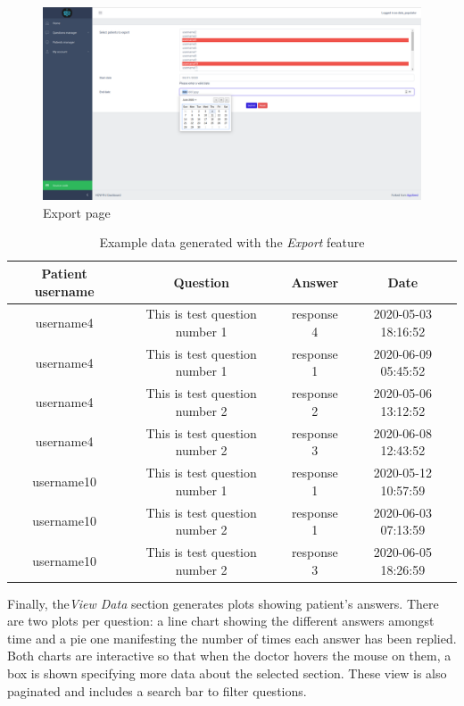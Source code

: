 \documentclass[12pt,english]{article}
\begin{document}
\begin{figure}[H]
  \centering
    \includegraphics[width=\textwidth]{export.png}
  \caption{Export page}
\end{figure}

\begin{table}[h!]
\begin{tabular}{|c|c|c|c|}
\hline
\textbf{Patient username} & \textbf{Question}& \textbf{Answer}& \textbf{Date} \\
\hline
username4 & This is test question number 1  & response 4 & 2020-05-03 18:16:52 \\

username4 & This is test question number 1  & response 1 & 2020-06-09 05:45:52 \\

username4 & This is test question number 2  & response 2 & 2020-05-06 13:12:52 \\

username4 & This is test question number 2  & response 3 & 2020-06-08 12:43:52 \\

username10 & This is test question number 1  & response 1 & 2020-05-12 10:57:59 \\

username10 & This is test question number 2  & response 1 & 2020-06-03 07:13:59 \\

username10 & This is test question number 2  & response 3 & 2020-06-05 18:26:59 \\
\hline
\end{tabular}
\caption{Example data generated with the \emph{Export} feature}
\end{table}

Finally, the\emph{View Data} section generates plots showing patient's answers. There are two plots per question: a line chart showing the different answers amongst time and a pie one manifesting the number of times each answer has been replied. Both charts are interactive so that when the doctor hovers the mouse on them, a box is shown specifying more data about the selected section. These view is also paginated and includes a search bar to filter questions.
\end{document}
